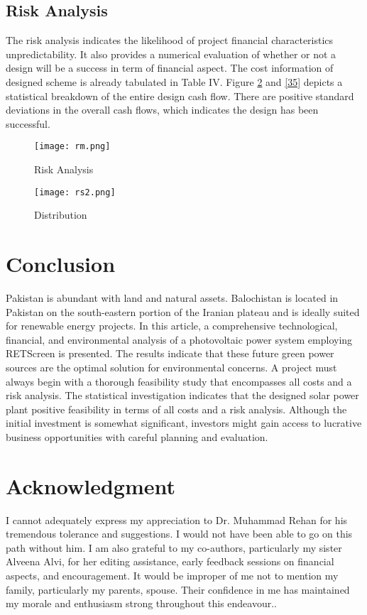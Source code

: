 \documentclass[conference]{IEEEtran}
\begin{document}
\subsection{Risk Analysis}
The risk analysis indicates the likelihood of project financial characteristics unpredictability. It also provides a numerical evaluation of whether or not a design will be a success in term of financial aspect. The cost information of designed scheme is already tabulated in Table IV. Figure \ref{fig34} and \ref{35} depicts a statistical breakdown of the entire design cash flow. There are positive standard deviations in the overall cash flows, which indicates the design has been successful.
\begin{figure}[!]
\centerline{\texttt{[image: rm.png]}}
\caption{Risk Analysis}
\label{fig34}
\end{figure}
\begin{figure}[!]
\centerline{\texttt{[image: rs2.png]}}
\caption{Distribution}
\label{fig34}
\end{figure}
\section{Conclusion}
Pakistan is abundant with land and natural assets. Balochistan is located in Pakistan on the south-eastern portion of the Iranian plateau and is ideally suited for renewable energy projects. In this article, a comprehensive technological, financial, and environmental analysis of a photovoltaic power system employing RETScreen is presented. The results indicate that these future green power sources are the optimal solution for environmental concerns.
A project must always begin with a thorough feasibility study that encompasses all costs and a risk analysis. The statistical investigation indicates that the designed solar power plant positive feasibility in terms of all costs and a risk analysis. Although the initial investment is somewhat significant, investors might gain access to lucrative business opportunities with careful planning and evaluation.
\section*{Acknowledgment}
I cannot adequately express my appreciation to Dr. Muhammad Rehan for his tremendous tolerance and suggestions. I would not have been able to go on this path without him. I am also grateful to my co-authors, particularly my sister Alveena Alvi, for her editing assistance, early feedback sessions on financial aspects, and encouragement. It would be improper of me not to mention my family, particularly my parents, spouse. Their confidence in me has maintained my morale and enthusiasm strong throughout this endeavour..


\end{document}
